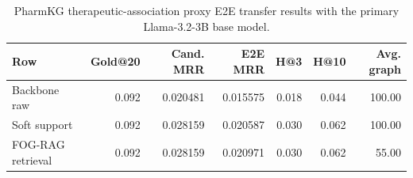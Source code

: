 \begin{table}[t]
\centering
\small
\begin{tabular}{lrrrrrr}
\hline
Row & Gold@20 & Cand. MRR & E2E MRR & H@3 & H@10 & Avg. graph \\
\hline
Backbone raw & 0.092 & 0.020481 & 0.015575 & 0.018 & 0.044 & 100.00 \\
Soft support & 0.092 & 0.028159 & 0.020587 & 0.030 & 0.062 & 100.00 \\
FOG-RAG retrieval & 0.092 & 0.028159 & 0.020971 & 0.030 & 0.062 & 55.00 \\
\hline
\end{tabular}
\caption{PharmKG therapeutic-association proxy E2E transfer results with the primary Llama-3.2-3B base model.}
\label{tab:pharmkg-e2e}
\end{table}
